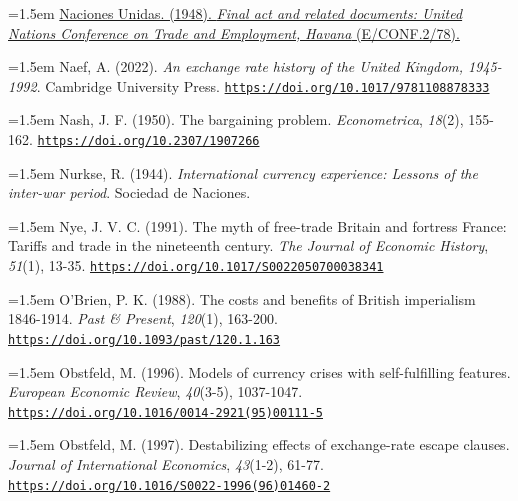 \documentclass[10pt,a4paper]{article}
\begin{document}
{\sloppy\noindent\hangindent=1.5em \href{https://digitallibrary.un.org/record/4083813}{Naciones Unidas. (1948). \textit{Final act and related documents: United Nations Conference on Trade and Employment, Havana} (E/CONF.2/78).}\par}

{\sloppy\noindent\hangindent=1.5em Naef, A. (2022). \textit{An exchange rate history of the United Kingdom, 1945-1992}. Cambridge University Press. \href{https://doi.org/10.1017/9781108878333}{\nolinkurl{https://doi.org/10.1017/9781108878333}}\par}

{\sloppy\noindent\hangindent=1.5em Nash, J. F. (1950). The bargaining problem. \textit{Econometrica}, \textit{18}(2), 155-162. \href{https://doi.org/10.2307/1907266}{\nolinkurl{https://doi.org/10.2307/1907266}}\par}

{\sloppy\noindent\hangindent=1.5em Nurkse, R. (1944). \textit{International currency experience: Lessons of the inter-war period}. Sociedad de Naciones.\par}

{\sloppy\noindent\hangindent=1.5em Nye, J. V. C. (1991). The myth of free-trade Britain and fortress France: Tariffs and trade in the nineteenth century. \textit{The Journal of Economic History}, \textit{51}(1), 13-35. \href{https://doi.org/10.1017/S0022050700038341}{\nolinkurl{https://doi.org/10.1017/S0022050700038341}}\par}

{\sloppy\noindent\hangindent=1.5em O'Brien, P. K. (1988). The costs and benefits of British imperialism 1846-1914. \textit{Past \& Present}, \textit{120}(1), 163-200. \href{https://doi.org/10.1093/past/120.1.163}{\nolinkurl{https://doi.org/10.1093/past/120.1.163}}\par}

{\sloppy\noindent\hangindent=1.5em Obstfeld, M. (1996). Models of currency crises with self-fulfilling features. \textit{European Economic Review}, \textit{40}(3-5), 1037-1047. \href{https://doi.org/10.1016/0014-2921(95)00111-5}{\nolinkurl{https://doi.org/10.1016/0014-2921(95)00111-5}}\par}

{\sloppy\noindent\hangindent=1.5em Obstfeld, M. (1997). Destabilizing effects of exchange-rate escape clauses. \textit{Journal of International Economics}, \textit{43}(1-2), 61-77. \href{https://doi.org/10.1016/S0022-1996(96)01460-2}{\nolinkurl{https://doi.org/10.1016/S0022-1996(96)01460-2}}\par}
\end{document}
